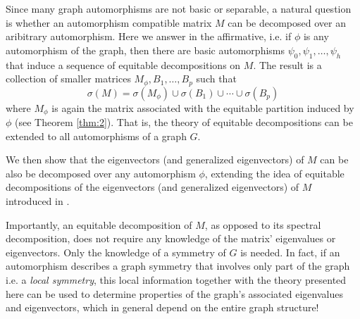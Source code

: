 \documentclass[preprint,12pt]{elsarticle}
\theoremstyle{definition}
\theoremstyle{remark}
\renewcommand{\emph}{\textit}
\begin{document}
Since many graph automorphisms are not basic or separable, a natural question is whether an automorphism compatible matrix $M$ can be decomposed over {an aribitrary automorphism}. Here we answer in the affirmative, i.e. if $\phi$ is any automorphism of the graph, then there are basic automorphisms $\psi_0,\psi_1,\dots,\psi_h$ that induce a sequence of equitable decompositions on $M$. The result is a collection of smaller matrices $M_{\phi},B_1,\dots,B_{p}$ such that
\begin{equation*}
\sigma(M)=\sigma(M_{\phi})\cup\sigma(B_1)\cup\cdots\cup\sigma(B_{p})
\end{equation*}
where $M_{\phi}$ is again the matrix associated with the equitable partition induced by $\phi$ (see Theorem \ref{thm:2}). That is, the theory of equitable decompositions can be extended to all automorphisms of a graph $G$.

We then show that the eigenvectors (and generalized eigenvectors) of $M$ can be also be decomposed over any automorphism $\phi$, extending the idea of equitable decompositions of the eigenvectors (and generalized eigenvectors) of $M$ introduced in \cite{FSSW}.

Importantly,  an equitable decomposition of $M$, as opposed to its spectral decomposition, does not require any knowledge of the matrix' eigenvalues or eigenvectors. Only the knowledge of a symmetry of $G$ is needed. {In fact, if an automorphism describes a graph symmetry that involves only part of the graph i.e. a \emph{local symmetry},} this local information together with the theory presented here can be used to determine properties of the graph's associated eigenvalues and eigenvectors, which in general depend on the entire graph structure!
\end{document}
